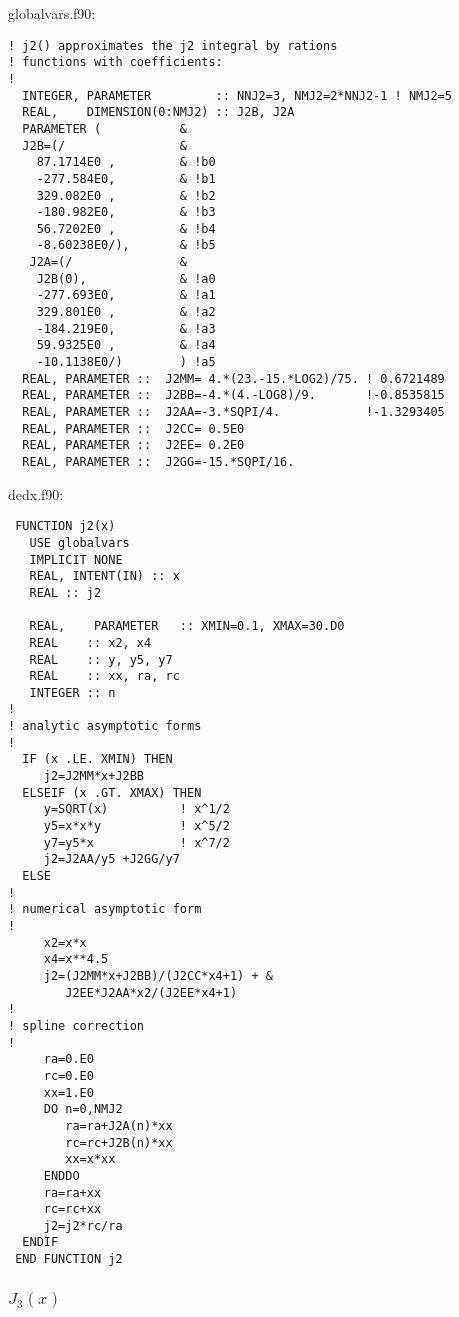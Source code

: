 \documentclass[preprint,12pt,eqsecnum,nofootinbib,amsmath,amssymb]{revtex4}
\begin{document}
{
\noindent
globalvars.f90:
\baselineskip12pt
\begin{verbatim}
! j2() approximates the j2 integral by rations
! functions with coefficients:
!
  INTEGER, PARAMETER         :: NNJ2=3, NMJ2=2*NNJ2-1 ! NMJ2=5
  REAL,    DIMENSION(0:NMJ2) :: J2B, J2A
  PARAMETER (           &
  J2B=(/                &
    87.1714E0 ,         & !b0
    -277.584E0,         & !b1
    329.082E0 ,         & !b2
    -180.982E0,         & !b3
    56.7202E0 ,         & !b4
    -8.60238E0/),       & !b5
   J2A=(/               & 
    J2B(0),             & !a0
    -277.693E0,         & !a1
    329.801E0 ,         & !a2
    -184.219E0,         & !a3
    59.9325E0 ,         & !a4
    -10.1138E0/)        ) !a5
  REAL, PARAMETER ::  J2MM= 4.*(23.-15.*LOG2)/75. ! 0.6721489
  REAL, PARAMETER ::  J2BB=-4.*(4.-LOG8)/9.       !-0.8535815
  REAL, PARAMETER ::  J2AA=-3.*SQPI/4.            !-1.3293405 
  REAL, PARAMETER ::  J2CC= 0.5E0
  REAL, PARAMETER ::  J2EE= 0.2E0
  REAL, PARAMETER ::  J2GG=-15.*SQPI/16.
\end{verbatim}
}


{
\noindent
dedx.f90:
\baselineskip12pt
\begin{verbatim}
 FUNCTION j2(x)
   USE globalvars
   IMPLICIT NONE
   REAL, INTENT(IN) :: x
   REAL :: j2

   REAL,    PARAMETER   :: XMIN=0.1, XMAX=30.D0
   REAL    :: x2, x4
   REAL    :: y, y5, y7
   REAL    :: xx, ra, rc
   INTEGER :: n
!
! analytic asymptotic forms
!
  IF (x .LE. XMIN) THEN
     j2=J2MM*x+J2BB
  ELSEIF (x .GT. XMAX) THEN
     y=SQRT(x)          ! x^1/2
     y5=x*x*y           ! x^5/2
     y7=y5*x            ! x^7/2
     j2=J2AA/y5 +J2GG/y7
  ELSE
!
! numerical asymptotic form
!
     x2=x*x
     x4=x**4.5
     j2=(J2MM*x+J2BB)/(J2CC*x4+1) + &
        J2EE*J2AA*x2/(J2EE*x4+1)
!
! spline correction
! 
     ra=0.E0
     rc=0.E0
     xx=1.E0
     DO n=0,NMJ2
        ra=ra+J2A(n)*xx
        rc=rc+J2B(n)*xx
        xx=x*xx
     ENDDO
     ra=ra+xx
     rc=rc+xx
     j2=j2*rc/ra
  ENDIF
 END FUNCTION j2
\end{verbatim}
}


\subsubsection{$J_3(x)$}
\end{document}
